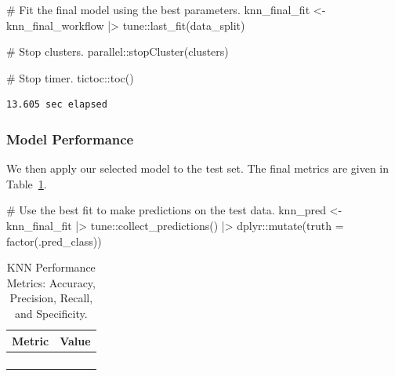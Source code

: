 \documentclass[
  letterpaper,
  DIV=11,
  numbers=noendperiod]{scrartcl}
\newenvironment{Shaded}{\begin{snugshade}}{\end{snugshade}}
\newcommand{\AttributeTok}[1]{\textcolor[rgb]{0.40,0.45,0.13}{#1}}
\newcommand{\CommentTok}[1]{\textcolor[rgb]{0.37,0.37,0.37}{#1}}
\newcommand{\FunctionTok}[1]{\textcolor[rgb]{0.28,0.35,0.67}{#1}}
\newcommand{\NormalTok}[1]{\textcolor[rgb]{0.00,0.23,0.31}{#1}}
\newcommand{\OtherTok}[1]{\textcolor[rgb]{0.00,0.23,0.31}{#1}}
\newcommand{\SpecialCharTok}[1]{\textcolor[rgb]{0.37,0.37,0.37}{#1}}
\begin{document}
\begin{Shaded}
\begin{Highlighting}[]
\CommentTok{\# Fit the final model using the best parameters.}
\NormalTok{knn\_final\_fit }\OtherTok{\textless{}{-}} 
\NormalTok{  knn\_final\_workflow }\SpecialCharTok{|\textgreater{}} 
\NormalTok{  tune}\SpecialCharTok{::}\FunctionTok{last\_fit}\NormalTok{(data\_split)}

\CommentTok{\# Stop clusters.}
\NormalTok{parallel}\SpecialCharTok{::}\FunctionTok{stopCluster}\NormalTok{(clusters)}

\CommentTok{\# Stop timer.}
\NormalTok{tictoc}\SpecialCharTok{::}\FunctionTok{toc}\NormalTok{()}
\end{Highlighting}
\end{Shaded}

\begin{verbatim}
13.605 sec elapsed
\end{verbatim}

\subsubsection{Model Performance}\label{model-performance}

We then apply our selected model to the test set. The final metrics are
given in Table~\ref{tbl-knn-performance}.

\begin{Shaded}
\begin{Highlighting}[]
\CommentTok{\# Use the best fit to make predictions on the test data.}
\NormalTok{knn\_pred }\OtherTok{\textless{}{-}} 
\NormalTok{  knn\_final\_fit }\SpecialCharTok{|\textgreater{}} 
\NormalTok{  tune}\SpecialCharTok{::}\FunctionTok{collect\_predictions}\NormalTok{() }\SpecialCharTok{|\textgreater{}}
\NormalTok{  dplyr}\SpecialCharTok{::}\FunctionTok{mutate}\NormalTok{(}\AttributeTok{truth =} \FunctionTok{factor}\NormalTok{(.pred\_class))}
\end{Highlighting}
\end{Shaded}

\begin{longtable}{>{\raggedright\arraybackslash}p{}>{\raggedleft\arraybackslash}p{}}

\caption{\label{tbl-knn-performance}KNN Performance Metrics: Accuracy,
Precision, Recall, and Specificity.}

\tabularnewline

\toprule
Metric & Value \\ 
\midrule\addlinespace[2.5pt]
\cellcolor[HTML]{FFFFFF}{Accuracy} & \cellcolor[HTML]{FFFFFF}{90.1} \\ 
\cellcolor[HTML]{FFFFFF}{Precision} & \cellcolor[HTML]{FFFFFF}{76.9} \\ 
\cellcolor[HTML]{FFFFFF}{Recall} & \cellcolor[HTML]{FFFFFF}{87.0} \\ 
\cellcolor[HTML]{FFFFFF}{Specificity} & \cellcolor[HTML]{FFFFFF}{91.2} \\ 
\bottomrule

\end{longtable}
\end{document}
